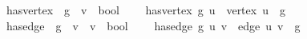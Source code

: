 \isamarkupfalse%
\ has{\isacharunderscore}{\kern0pt}vertex\ {\isacharcolon}{\kern0pt}{\isacharcolon}{\kern0pt}\ {\isachardoublequoteopen}{\isacharprime}{\kern0pt}g\ {\isasymRightarrow}\ {\isacharprime}{\kern0pt}v\ {\isasymRightarrow}\ bool{\isachardoublequoteclose}\ \ \isanewline
\ \ {\isachardoublequoteopen}has{\isacharunderscore}{\kern0pt}vertex\ g\ u\ {\isasymequiv}\ vertex\ u\ {\isasymsqsubseteq}\ g{\isachardoublequoteclose}\isanewline
{}\isamarkupfalse%
\ has{\isacharunderscore}{\kern0pt}edge\ {\isacharcolon}{\kern0pt}{\isacharcolon}{\kern0pt}\ {\isachardoublequoteopen}{\isacharprime}{\kern0pt}g\ {\isasymRightarrow}\ {\isacharprime}{\kern0pt}v\ {\isasymRightarrow}\ {\isacharprime}{\kern0pt}v\ {\isasymRightarrow}\ bool{\isachardoublequoteclose}\ \ \isanewline
\ \ {\isachardoublequoteopen}has{\isacharunderscore}{\kern0pt}edge\ g\ u\ v\ {\isasymequiv}\ edge\ u\ v\ {\isasymsqsubseteq}\ g{\isachardoublequoteclose}
